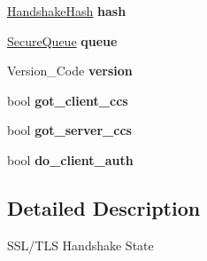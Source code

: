 \begin{DoxyCompactItemize}
\item 
\hypertarget{classBotan_1_1Handshake__State_a1c268c119bb5f58d9be8ae7ec8979df8}{\hyperlink{classBotan_1_1HandshakeHash}{Handshake\-Hash} {\bfseries hash}}\label{classBotan_1_1Handshake__State_a1c268c119bb5f58d9be8ae7ec8979df8}

\item 
\hypertarget{classBotan_1_1Handshake__State_adde4f8bacc34c6c4692d22972b7d22fd}{\hyperlink{classBotan_1_1SecureQueue}{Secure\-Queue} {\bfseries queue}}\label{classBotan_1_1Handshake__State_adde4f8bacc34c6c4692d22972b7d22fd}

\item 
\hypertarget{classBotan_1_1Handshake__State_a3726251260a1b22a20649348ff8cee0a}{Version\-\_\-\-Code {\bfseries version}}\label{classBotan_1_1Handshake__State_a3726251260a1b22a20649348ff8cee0a}

\item 
\hypertarget{classBotan_1_1Handshake__State_a62fef13539e43b771d27ba92e65fdd4e}{bool {\bfseries got\-\_\-client\-\_\-ccs}}\label{classBotan_1_1Handshake__State_a62fef13539e43b771d27ba92e65fdd4e}

\item 
\hypertarget{classBotan_1_1Handshake__State_ad299aff93ad6609437c77c169779158c}{bool {\bfseries got\-\_\-server\-\_\-ccs}}\label{classBotan_1_1Handshake__State_ad299aff93ad6609437c77c169779158c}

\item 
\hypertarget{classBotan_1_1Handshake__State_aab393d5e0ad4d8b64922f020e48e5766}{bool {\bfseries do\-\_\-client\-\_\-auth}}\label{classBotan_1_1Handshake__State_aab393d5e0ad4d8b64922f020e48e5766}

\end{DoxyCompactItemize}


\subsection{Detailed Description}
S\-S\-L/\-T\-L\-S Handshake State 

